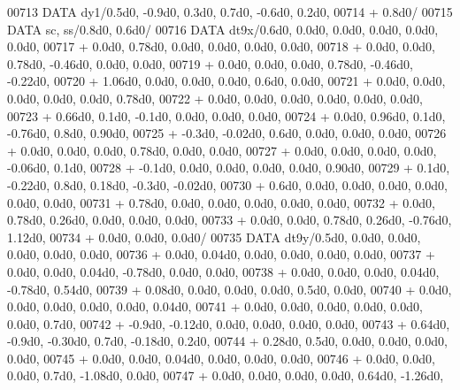 \begin{DoxyCode}
00713       \textcolor{keyword}{DATA}              dy1/0.5d0, -0.9d0, 0.3d0, 0.7d0, -0.6d0, 0.2d0,
00714      +                  0.8d0/
00715       \textcolor{keyword}{DATA}              sc, ss/0.8d0, 0.6d0/
00716       \textcolor{keyword}{DATA}              dt9x/0.6d0, 0.0d0, 0.0d0, 0.0d0, 0.0d0, 0.0d0,
00717      +                  0.0d0, 0.78d0, 0.0d0, 0.0d0, 0.0d0, 0.0d0,
00718      +                  0.0d0, 0.0d0, 0.78d0, -0.46d0, 0.0d0, 0.0d0,
00719      +                  0.0d0, 0.0d0, 0.0d0, 0.78d0, -0.46d0, -0.22d0,
00720      +                  1.06d0, 0.0d0, 0.0d0, 0.0d0, 0.6d0, 0.0d0,
00721      +                  0.0d0, 0.0d0, 0.0d0, 0.0d0, 0.0d0, 0.78d0,
00722      +                  0.0d0, 0.0d0, 0.0d0, 0.0d0, 0.0d0, 0.0d0,
00723      +                  0.66d0, 0.1d0, -0.1d0, 0.0d0, 0.0d0, 0.0d0,
00724      +                  0.0d0, 0.96d0, 0.1d0, -0.76d0, 0.8d0, 0.90d0,
00725      +                  -0.3d0, -0.02d0, 0.6d0, 0.0d0, 0.0d0, 0.0d0,
00726      +                  0.0d0, 0.0d0, 0.0d0, 0.78d0, 0.0d0, 0.0d0,
00727      +                  0.0d0, 0.0d0, 0.0d0, 0.0d0, -0.06d0, 0.1d0,
00728      +                  -0.1d0, 0.0d0, 0.0d0, 0.0d0, 0.0d0, 0.90d0,
00729      +                  0.1d0, -0.22d0, 0.8d0, 0.18d0, -0.3d0, -0.02d0,
00730      +                  0.6d0, 0.0d0, 0.0d0, 0.0d0, 0.0d0, 0.0d0, 0.0d0,
00731      +                  0.78d0, 0.0d0, 0.0d0, 0.0d0, 0.0d0, 0.0d0,
00732      +                  0.0d0, 0.78d0, 0.26d0, 0.0d0, 0.0d0, 0.0d0,
00733      +                  0.0d0, 0.0d0, 0.78d0, 0.26d0, -0.76d0, 1.12d0,
00734      +                  0.0d0, 0.0d0, 0.0d0/
00735       \textcolor{keyword}{DATA}              dt9y/0.5d0, 0.0d0, 0.0d0, 0.0d0, 0.0d0, 0.0d0,
00736      +                  0.0d0, 0.04d0, 0.0d0, 0.0d0, 0.0d0, 0.0d0,
00737      +                  0.0d0, 0.0d0, 0.04d0, -0.78d0, 0.0d0, 0.0d0,
00738      +                  0.0d0, 0.0d0, 0.0d0, 0.04d0, -0.78d0, 0.54d0,
00739      +                  0.08d0, 0.0d0, 0.0d0, 0.0d0, 0.5d0, 0.0d0,
00740      +                  0.0d0, 0.0d0, 0.0d0, 0.0d0, 0.0d0, 0.04d0,
00741      +                  0.0d0, 0.0d0, 0.0d0, 0.0d0, 0.0d0, 0.0d0, 0.7d0,
00742      +                  -0.9d0, -0.12d0, 0.0d0, 0.0d0, 0.0d0, 0.0d0,
00743      +                  0.64d0, -0.9d0, -0.30d0, 0.7d0, -0.18d0, 0.2d0,
00744      +                  0.28d0, 0.5d0, 0.0d0, 0.0d0, 0.0d0, 0.0d0,
00745      +                  0.0d0, 0.0d0, 0.04d0, 0.0d0, 0.0d0, 0.0d0,
00746      +                  0.0d0, 0.0d0, 0.0d0, 0.7d0, -1.08d0, 0.0d0,
00747      +                  0.0d0, 0.0d0, 0.0d0, 0.0d0, 0.64d0, -1.26d0,

\end{DoxyCode}
